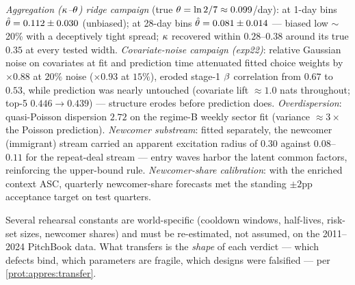 \emph{Aggregation ($\kappa$--$\theta$) ridge campaign} (true
$\theta = \ln 2/7 \approx 0.099$/day): at 1-day bins
$\hat{\theta} = 0.112 \pm 0.030$ (unbiased); at 28-day bins
$\hat{\theta} = 0.081 \pm 0.014$ --- biased low $\sim$20\% with a
deceptively tight spread; $\kappa$ recovered within $0.28$--$0.38$
around its true $0.35$ at every tested width. \emph{Covariate-noise
campaign (exp22)}: relative Gaussian noise on covariates at fit and
prediction time attenuated fitted choice weights by $\times 0.88$ at
$20\%$ noise ($\times 0.93$ at $15\%$), eroded stage-1 $\beta$
correlation from $0.67$ to $0.53$, while prediction was nearly
untouched (covariate lift $\approx 1.0$ nats throughout; top-5
$0.446 \to 0.439$) --- structure erodes before prediction does.
\emph{Overdispersion}: quasi-Poisson dispersion $2.72$ on the regime-B
weekly sector fit (variance $\approx 3\times$ the Poisson prediction).
\emph{Newcomer substream}: fitted separately, the newcomer (immigrant)
stream carried an apparent excitation radius of $0.30$ against
$0.08$--$0.11$ for the repeat-deal stream --- entry waves harbor the
latent common factors, reinforcing the upper-bound rule.
\emph{Newcomer-share calibration}: with the enriched context ASC,
quarterly newcomer-share forecasts met the standing $\pm 2$pp
acceptance target on test quarters.

\begin{warning}\label{warn:appres:context}
Several rehearsal constants are world-specific (cooldown windows,
half-lives, risk-set sizes, newcomer shares) and must be re-estimated,
not assumed, on the 2011--2024 PitchBook data. What transfers is the
\emph{shape} of each verdict --- which defects bind, which parameters
are fragile, which designs were falsified --- per
\cref{prot:appres:transfer}.
\end{warning}
